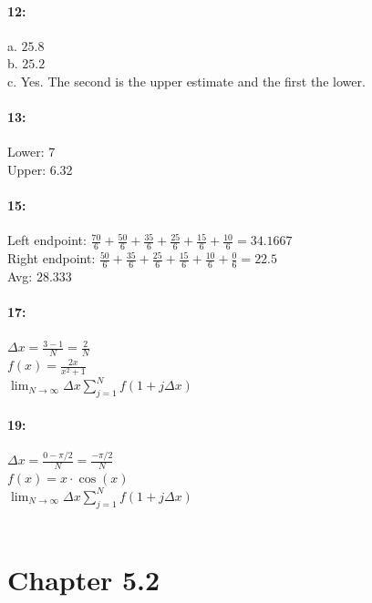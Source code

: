 \documentclass[12pt]{article}
\begin{document}
    \paragraph*{12:\\}
    a. $25.8$\\
    b. $25.2$\\
    c. Yes. The second is the upper estimate and the first the lower.

    \paragraph*{13:\\}
    Lower: 7\\
    Upper: 6.32\\

    \paragraph*{15:\\}
    Left endpoint: $\frac{70}{6} + \frac{50}{6} + \frac{35}{6} + \frac{25}{6} + \frac{15}{6} + \frac{10}{6} = 34.1667$\\
    Right endpoint: $\frac{50}{6} + \frac{35}{6} + \frac{25}{6} + \frac{15}{6} + \frac{10}{6} + \frac{0}{6} = 22.5$\\
    Avg: $28.333$\\

    \paragraph*{17:\\}
    $\Delta x = \frac{3-1}{N} = \frac{2}{N}$\\
    $f(x) = \frac{2x}{x^2 + 1}$\\
    $\lim_{N \to \infty} \Delta x \sum\limits_{j=1}^{N}f(1 + j \Delta x)$\\

    \paragraph*{19:\\}
    $\Delta x = \frac{0-\pi/2}{N} = \frac{-\pi/2}{N}$\\
    $f(x) = x \cdot \cos(x)$ \\
    $\lim_{N \to \infty} \Delta x \sum\limits_{j=1}^{N}f(1 + j \Delta x)$\\\\

    \section*{Chapter 5.2}
\end{document}
